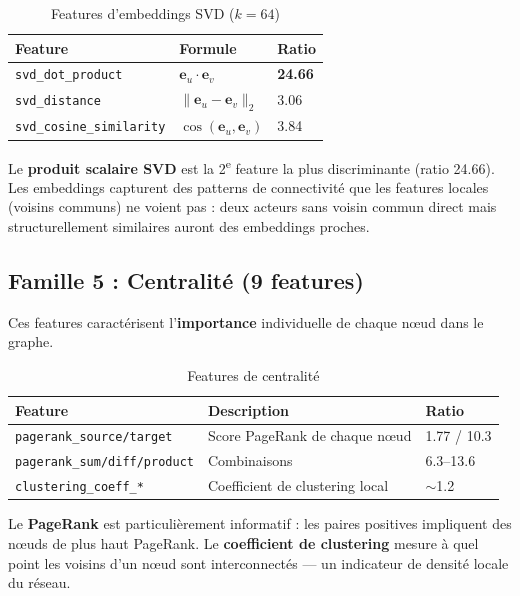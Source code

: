 \documentclass[12pt,a4paper]{article}
\begin{document}
\begin{table}[H]
\centering
\begin{tabular}{p{5cm}p{6cm}p{2cm}}
\toprule
\textbf{Feature} & \textbf{Formule} & \textbf{Ratio} \\
\midrule
\texttt{svd\_dot\_product} & $\mathbf{e}_u \cdot \mathbf{e}_v$ & \textbf{24.66} \\
\texttt{svd\_distance} & $\|\mathbf{e}_u - \mathbf{e}_v\|_2$ & 3.06 \\
\texttt{svd\_cosine\_similarity} & $\cos(\mathbf{e}_u, \mathbf{e}_v)$ & 3.84 \\
\bottomrule
\end{tabular}
\caption{Features d'embeddings SVD ($k=64$)}
\end{table}

Le \textbf{produit scalaire SVD} est la 2\textsuperscript{e} feature la plus discriminante (ratio 24.66). Les embeddings capturent des patterns de connectivité que les features locales (voisins communs) ne voient pas : deux acteurs sans voisin commun direct mais structurellement similaires auront des embeddings proches.

\subsection{Famille 5 : Centralité (9 features)}

Ces features caractérisent l'\textbf{importance} individuelle de chaque nœud dans le graphe.

\begin{table}[H]
\centering
\small
\begin{tabular}{p{5cm}p{6cm}p{2cm}}
\toprule
\textbf{Feature} & \textbf{Description} & \textbf{Ratio} \\
\midrule
\texttt{pagerank\_source/target} & Score PageRank de chaque nœud & 1.77 / 10.3 \\
\texttt{pagerank\_sum/diff/product} & Combinaisons & 6.3--13.6 \\
\texttt{clustering\_coeff\_*} & Coefficient de clustering local & $\sim$1.2 \\
\bottomrule
\end{tabular}
\caption{Features de centralité}
\end{table}

Le \textbf{PageRank} est particulièrement informatif : les paires positives impliquent des nœuds de plus haut PageRank. Le \textbf{coefficient de clustering} mesure à quel point les voisins d'un nœud sont interconnectés — un indicateur de densité locale du réseau.
\end{document}
